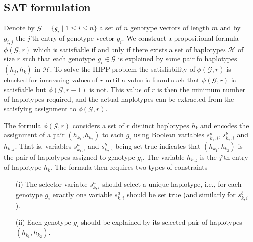 \documentclass[12pt,a4paper]{article}
\begin{document}
\subsection{SAT formulation}

Denote by $\mathcal{G}=\{g_i\mid 1\leq i \leq n\}$ a set of $n$ genotype vectors of length $m$ and by $g_{i,j}$ the $j$'th entry of genotype vector $g_i$.
We construct a propositional formula $\phi (\mathcal{G}, r)$ which is satisfiable if and only if there exists a set of haplotypes $\mathcal{H}$ of size $r$ such that each genotype $g_i\in \mathcal{G}$ is explained by some pair fo haplotypes $(h_j, h_k)$ in $\mathcal{H}$.
To solve the HIPP problem the satisfiability of $\phi (\mathcal{G}, r)$ is checked for increasing values of $r$ until a value is found such that $\phi (\mathcal{G}, r)$ is satisfiable but $\phi (\mathcal{G}, r-1)$ is not.
This value of $r$ is then the minimum number of haplotypes required, and the actual haplotypes can be extracted from the satisfying assignment to $\phi (\mathcal{G}, r)$.

The formula $\phi (\mathcal{G}, r)$ considers a set of $r$ distinct haplotypes $h_k$ and encodes the assignment of a pair $(h_{k_1}, h_{k_2})$ to each $g_i$ using Boolean variables $s^a_{k_1,i}$, $s^b_{k_2,i}$ and $h_{k,j}$.
That is, variables $s^a_{k_1,i}$ and $s^b_{k_2,i}$ being set true indicates that $(h_{k_1}, h_{k_2})$ is the pair of haplotypes assigned to genotype $g_i$.
The variable $h_{k,j}$ is the $j$'th entry of haplotype $h_k$.
The formula then requires two types of constraints
\begin{enumerate}
\item[(i)] The selector variable $s^a_{k,i}$ should select a unique haplotype, i.e., for each genotype $g_i$ exactly one variable $s^a_{k,i}$ should be set true (and similarly for $s^b_{k,i}$). 
\item[(ii)] Each genotype $g_i$ should be explained by its selected pair of haplotypes $(h_{k_1}, h_{k_2})$. 
\end{enumerate}
\end{document}
